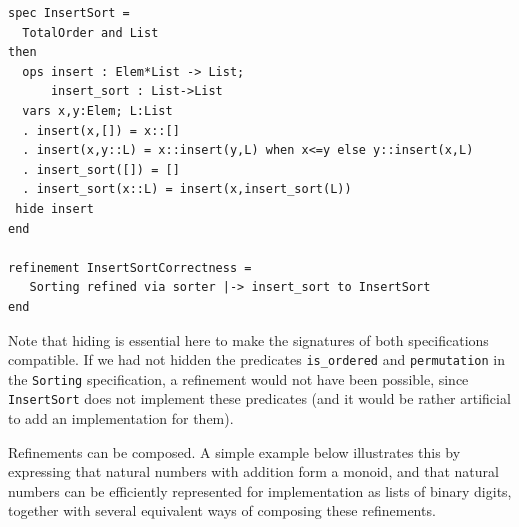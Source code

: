 \documentclass[10pt,fleqn,%
\ifpretendfinal
final%
\else
draft%
\fi,
]{scrreprt}
\begin{document}
\begin{lstlisting}[basicstyle=\ttfamily\footnotesize,language=dolText,morekeywords={sort, ops, refinement, free,spec type, assoc, unit,props,op,spec,refined, via,generated, then,ObjectProperty,Class,DisjointUnionOf,SubClassOf,Characteristics,Transitive,Asymmetric,SubPropertyOf,DisjointClasses,EquivalentTo,inverse,only,forall,iff,if,or,exists,distributed,from},escapechar=@,mathescape]	
spec InsertSort = 
  TotalOrder and List
then
  ops insert : Elem*List -> List;
      insert_sort : List->List
  vars x,y:Elem; L:List
  . insert(x,[]) = x::[]
  . insert(x,y::L) = x::insert(y,L) when x<=y else y::insert(x,L)
  . insert_sort([]) = []
  . insert_sort(x::L) = insert(x,insert_sort(L))
 hide insert
end

refinement InsertSortCorrectness =
   Sorting refined via sorter |-> insert_sort to InsertSort
end
\end{lstlisting}
Note that hiding is essential here to make the signatures of
both specifications compatible. If we had not hidden the
predicates \texttt{is\_ordered} and \texttt{permutation}
in the \texttt{Sorting} specification, a refinement would
not have been possible, since \texttt{InsertSort} does not
implement these predicates (and it would be rather artificial
to add an implementation for them).

\medskip

Refinements can be composed. A simple example below illustrates this
by expressing that natural numbers with addition form a monoid, and
that natural numbers can be efficiently represented for implementation
as lists of binary digits, together with several equivalent ways of
composing these refinements.
\end{document}
